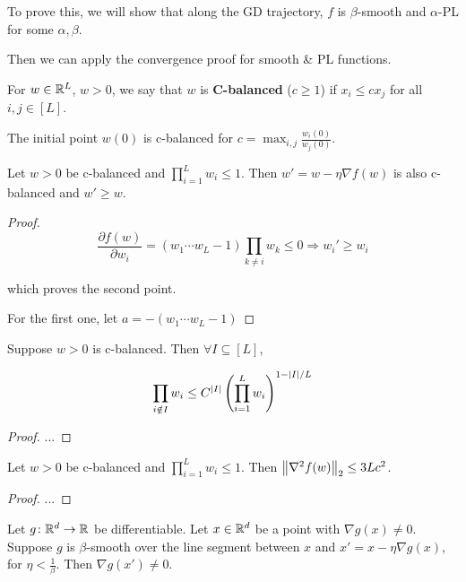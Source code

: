 To prove this, we will show that along the GD trajectory, 
\(f\) is \(\beta\)-smooth and \(\alpha\)-PL for some \(\alpha, \beta\). 

Then we can apply the convergence proof for smooth \& PL functions. 


\begin{definition}
    For \(w \in \mathbb{R}^L\), \(w > 0\), we say that \(w\) is \textbf{C-balanced} (\(c \geq 1\))
    if \(x_i \leq c x_j\) for all \(i, j \in [L]\). 
\end{definition}

The initial point \(w(0)\) is c-balanced for \(c = \max_{i, j}\frac{w_i (0)}{w_j (0)}\). 

\begin{lemma}
    Let \(w > 0\) be c-balanced and \(\prod^L_{i=1} w_i \leq 1\). Then \(w' = w - \eta \nabla f(w)\)
    is also c-balanced and \(w' \geq w\). 
\end{lemma}

\begin{proof}
    \[
        \frac{\partial f(w)}{\partial w_i} = \left( w_1 \cdots w_L - 1  \right) \prod_{k \neq i} w_k \leq 0 
        \Rightarrow w_i' \geq w_i   
    \]

    which proves the second point. 

    For the first one, let \(a = - (w_1\cdots w_L - 1)\)
\end{proof}


\begin{lemma}
    Suppose \(w > 0\) is c-balanced. Then \(\forall I \subseteq [L]\), 

    \[
        \prod_{i \notin I} w_i \leq C^{\lvert I \rvert} \left( \prod_{i=1}^L w_i \right)^{1 - \lvert I \rvert/L}  
    \]
\end{lemma}
\begin{proof}
    ... 
\end{proof}

\begin{lemma}[smoothness]
    Let \(w > 0\) be c-balanced and \(\prod_{i=1}^L w_i \leq 1\). Then \(\norm{\nabla^2 f(w)}_2 
    \leq 3 L c^2\). 
\end{lemma}

\begin{proof}
    ... 
\end{proof}


\begin{lemma}
    Let \(g \colon \mathbb{R}^d \to \mathbb{R}\) be differentiable. Let \(x \in \mathbb{R}^d\) be a point 
    with \(\nabla g(x) \neq 0\). Suppose \(g\) is \(\beta\)-smooth over the  line 
    segment between \(x\) and \(x' = x - \eta \nabla g(x)\), for \(\eta < \frac{1}{\beta}\). 
    Then \(\nabla g(x') \neq 0\). 
\end{lemma}


